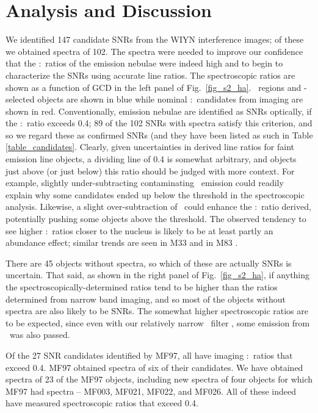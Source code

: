 \section{Analysis and Discussion}

We identified 147 candidate SNRs from the WIYN interference images; of these we obtained spectra of 102. The spectra were needed to improve our confidence that the \sii:\ha\ ratios of the emission nebulae were indeed high and to begin to characterize the SNRs using accurate line ratios.  The spectroscopic ratios are shown as a function of GCD in the left panel of  Fig.\ \ref{fig_s2_ha}. \hii\ regions and \oiii-selected objects are shown in blue while nominal \sii:\ha\ candidates from imaging are shown in red.   Conventionally, emission nebulae are identified as SNRs optically, if the \sii:\ha\ ratio exceeds 0.4; 89 of the 102 SNRs with spectra satisfy this criterion, and so we regard these as confirmed SNRs (and they have been listed as such in Table \ref{table_candidates}. Clearly, given uncertainties in derived line ratios for faint emission line objects, a dividing line of 0.4 is somewhat arbitrary, and objects just above (or just below) this ratio should be judged with more context.  For example, slightly under-subtracting contaminating \ha\ emission could readily explain why some candidates ended up below the threshold in the spectroscopic analysis. Likewise, a slight over-subtraction of \ha\ could enhance the \sii:\ha\ ratio derived, potentially pushing some objects above the threshold.  The observed tendency to see higher \sii:\ha\ ratios closer to the nucleus is likely to be at least partly an abundance effect; similar trends are seen in M33 \citep{long18} and in M83 \citep{winkler17}. 

There are 45 objects without spectra, so which of these are actually SNRs is uncertain.  That said, as shown in the right panel of Fig.\ \ref{fig_s2_ha}, if anything the spectroscopically-determined ratios tend to be higher than the ratios determined from narrow band imaging, and so most of the objects without spectra are also likely to be SNRs.  The somewhat higher spectroscopic ratios are to be expected, since even with our relatively narrow \ha\ filter , some emission from \nii\ was  also passed.   

Of the 27 SNR candidates identified by MF97, all have imaging \sii:\ha\ ratios that exceed 0.4. MF97 obtained spectra of six of their candidates.  We have obtained spectra of 23 of the MF97 objects, including new spectra of four objects for which MF97 had spectra -- MF003, MF021, MF022, and MF026.  All of these indeed have measured spectroscopic ratios that exceed 0.4.

